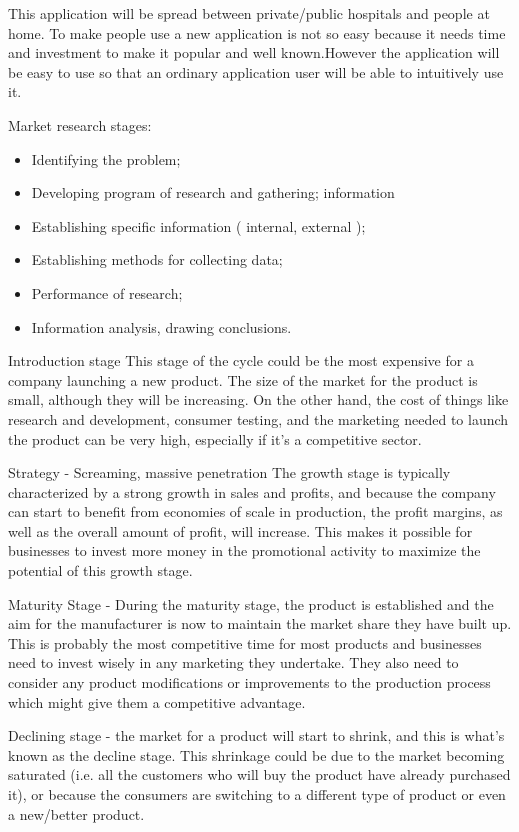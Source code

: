 This application will be spread between private/public hospitals and people at home. To make people use a new application is not so easy because it needs time and investment to make it popular and well known.However the application will be easy to use so that an ordinary application user will be able to intuitively use it.

Market research stages:
\begin{itemize}
 \item Identifying the problem;
 \item Developing program of research and gathering;
information
 \item Establishing specific information ( internal, external );
 \item Establishing methods for collecting data;
 \item Performance of research;
 \item Information analysis, drawing conclusions.
\end{itemize}

Introduction stage This stage of the cycle could be the most expensive for a company launching a new product. The size of the market for the product is small, although they will be increasing. On the other hand, the cost of things like research and development, consumer testing, and the marketing needed to launch the product can be very high, especially if it's a competitive sector.

Strategy - Screaming, massive penetration The growth stage is typically characterized by a strong growth in sales and profits, and because the company can start to benefit from economies of scale in production, the profit margins, as well as the overall amount of profit, will increase. This makes it possible for businesses to invest more money in the promotional activity to maximize the potential of this growth stage.

Maturity Stage - During the maturity stage, the product is established and the aim for the manufacturer is now to maintain the market share they have built up. This is probably the most competitive time for most products and businesses need to invest wisely in any marketing they undertake. They also need to consider any product modifications or improvements to the production process which might give them a competitive advantage.

Declining stage - the market for a product will start to shrink, and this is what's known as the decline stage. This shrinkage could be due to the market becoming saturated (i.e. all the customers who will buy the product have already purchased it), or because the consumers are switching to a different type of product or even a new/better product.


